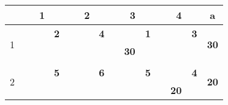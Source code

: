 \documentclass[a4paper, 12pt]{article}
\begin{document}
\begin{table}[H]
  \centering
    \begin{tabular}{|c|cccc|cccc|cccc|cccc|r|}
    \hline
          & \multicolumn{4}{c|}{1}        & \multicolumn{4}{c|}{2}        & \multicolumn{4}{c|}{3}        & \multicolumn{4}{c|}{4}        & \multicolumn{1}{c|}{a} \bigstrut\\
    \hline
    \multirow{4}[6]{*}{1} &       &       & \multicolumn{1}{r|}{} & \textbf{2} &       &       & \multicolumn{1}{r|}{} & \textbf{4} &       &       & \multicolumn{1}{r|}{} & \cellcolor[rgb]{ 1,  .753,  0}\textbf{1} &       &       & \multicolumn{1}{r|}{} & \textbf{3} & \multicolumn{1}{c|}{\multirow{4}[6]{*}{\textbf{30}}} \bigstrut\\
\cline{5-5}\cline{9-9}\cline{13-13}\cline{17-17}          &       & \multicolumn{2}{c}{\multirow{2}[2]{*}{}} & \multirow{3}[4]{*}{} &       & \multicolumn{2}{c}{\multirow{2}[2]{*}{}} &       &       & \multicolumn{2}{c}{\multirow{2}[2]{*}{\textbf{30}}} &       &       & \multicolumn{2}{c}{\multirow{2}[2]{*}{}} &       &  \bigstrut[t]\\
          &       & \multicolumn{2}{c}{} &       &       & \multicolumn{2}{c}{} &       &       & \multicolumn{2}{c}{} &       &       & \multicolumn{2}{c}{} &       &  \bigstrut[b]\\
\cline{2-2}\cline{6-6}\cline{10-10}\cline{14-14}          & \multicolumn{1}{c|}{} & \multicolumn{2}{c}{} &       & \multicolumn{1}{c|}{} & \multicolumn{2}{c}{} &       & \multicolumn{1}{c|}{} & \multicolumn{2}{c}{} &       & \multicolumn{1}{c|}{} & \multicolumn{2}{c}{} &       &  \bigstrut\\
    \hline
    \multirow{4}[6]{*}{2} &       &       & \multicolumn{1}{r|}{} & \textbf{5} &       &       & \multicolumn{1}{r|}{} & \textbf{6} &       &       & \multicolumn{1}{r|}{} & \textbf{5} &       &       & \multicolumn{1}{r|}{} & \cellcolor[rgb]{ 1,  .753,  0}\textbf{4} & \multicolumn{1}{c|}{\multirow{4}[6]{*}{\textbf{20}}} \bigstrut\\
\cline{5-5}\cline{9-9}\cline{13-13}\cline{17-17}          &       & \multicolumn{2}{c}{\multirow{2}[2]{*}{}} &       &       & \multicolumn{2}{c}{\multirow{2}[2]{*}{}} &       &       & \multicolumn{2}{c}{\multirow{2}[2]{*}{}} & \multirow{3}[4]{*}{} &       & \multicolumn{2}{c}{\multirow{2}[2]{*}{\textbf{20}}} &       &  \bigstrut[t]\\
          &       & \multicolumn{2}{c}{} &       &       & \multicolumn{2}{c}{} &       &       & \multicolumn{2}{c}{} &       &       & \multicolumn{2}{c}{} &       &  \bigstrut[b]\\

\end{tabular}
\end{table}
\end{document}
